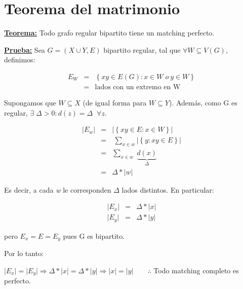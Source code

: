 \documentclass[12pt,a4paper]{report}
\begin{document}
	\section{Teorema del matrimonio}
	
		\textbf{\underline{Teorema:}} Todo grafo regular bipartito tiene un matching perfecto.
		
		\textbf{\underline{Prueba:}} Sea $G = (X \cup Y, E)$ bipartito regular, tal que $\forall W \subseteq V(G)$, definimos:
		
		\begin{eqnarray}
			\nonumber E_{W} &=& \left\lbrace xy \in E(G): x \in W \; o \ y \in W \right\rbrace \\
			\nonumber &=& \text{lados con un extremo en W}
		\end{eqnarray}
		
		Supongamos que $W \subseteq X$ (de igual forma para $W \subseteq Y$). Además, como G es regular, $\exists \; \Delta > 0 : d(z) = \Delta \; \; \forall z$.
		
		\begin{eqnarray}
			\nonumber \lvert E_{w} \rvert &=& \lvert \left\lbrace xy \in E: x \in W \right\rbrace \rvert \\
			\nonumber &=&\ \sum_{x \in w} \lvert \left\lbrace y : xy \in E \right\rbrace \rvert \\
			\nonumber &=& \sum_{x \in w} \; \underbrace{d(x)}_{\Delta} \\
			\nonumber &=& \Delta * \lvert w \rvert
		\end{eqnarray}
		
		Es decir, a cada \textit{w} le corresponden $\Delta$ lados distintos. En particular:
		
		\begin{eqnarray}
		\nonumber \lvert E_{x} \rvert &=& \Delta * \lvert x \rvert \\
		\nonumber \lvert E_{y} \rvert &=& \Delta * \lvert y \rvert
		\end{eqnarray}
		
		pero $E_{x} = E = E_{y}$ pues G es bipartito.
		
		\vspace{5mm}
		Por lo tanto:
		
		\vspace{3mm}
		$ \lvert E_{x} \rvert = \lvert E_{y} \rvert \Rightarrow \Delta * \lvert x \rvert = \Delta * \lvert y \rvert \Rightarrow \lvert x \rvert = \lvert y \rvert \qquad \therefore$ Todo matching completo es perfecto.
		
\end{document}
